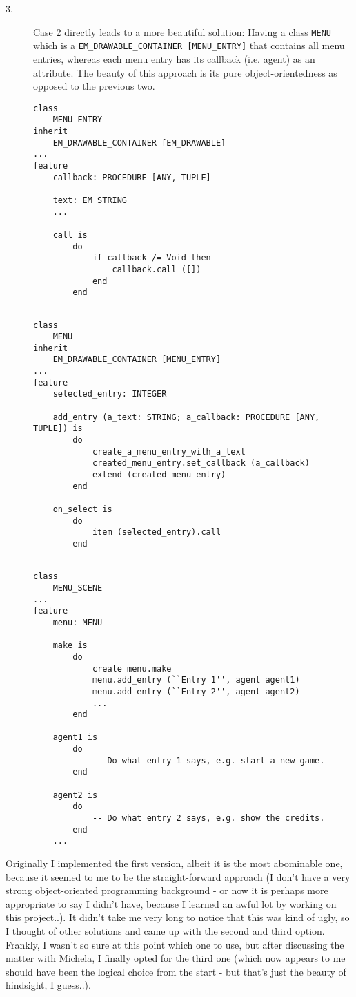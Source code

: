 \begin{description}
\begin{lstlisting}
    \end{lstlisting}

  \item[3.] Case 2 directly leads to a more beautiful solution: Having a class \texttt{MENU} which is a \texttt{EM\_DRAWABLE\_CONTAINER [MENU\_ENTRY]} that contains all menu entries, whereas each menu entry has its callback (i.e. agent) as an attribute. The beauty of this approach is its pure object-orientedness as opposed to the previous two.
    \begin{lstlisting}
class
	MENU_ENTRY
inherit
	EM_DRAWABLE_CONTAINER [EM_DRAWABLE]
...
feature
	callback: PROCEDURE [ANY, TUPLE]
	
	text: EM_STRING
	...
	
	call is
		do
			if callback /= Void then
				callback.call ([])
			end
		end
	
    \end{lstlisting}    
    \begin{lstlisting}
class
	MENU
inherit
	EM_DRAWABLE_CONTAINER [MENU_ENTRY]
...
feature
	selected_entry: INTEGER
	
	add_entry (a_text: STRING; a_callback: PROCEDURE [ANY, TUPLE]) is
		do
			create_a_menu_entry_with_a_text
			created_menu_entry.set_callback (a_callback)
			extend (created_menu_entry)
		end
	
	on_select is
		do
			item (selected_entry).call
		end
      
    \end{lstlisting}
    \begin{lstlisting}
class
	MENU_SCENE
...
feature
	menu: MENU
	
	make is
		do
			create menu.make
			menu.add_entry (``Entry 1'', agent agent1)
			menu.add_entry (``Entry 2'', agent agent2)
			...
		end

	agent1 is
		do
			-- Do what entry 1 says, e.g. start a new game.
		end
	
	agent2 is
		do
			-- Do what entry 2 says, e.g. show the credits.
		end
	...		
    \end{lstlisting}
\end{description}

Originally I implemented the first version, albeit it is the most abominable one, because it seemed to me to be the straight-forward approach (I don't have a very strong object-oriented programming background - or now it is perhaps more appropriate to say I didn't have, because I learned an awful lot by working on this project..). It didn't take me very long to notice that this was kind of ugly, so I thought of other solutions and came up with the second and third option. Frankly, I wasn't so sure at this point which one to use, but after discussing the matter with Michela, I finally opted for the third one (which now appears to me should have been the logical choice from the start - but that's just the beauty of hindsight, I guess..).

